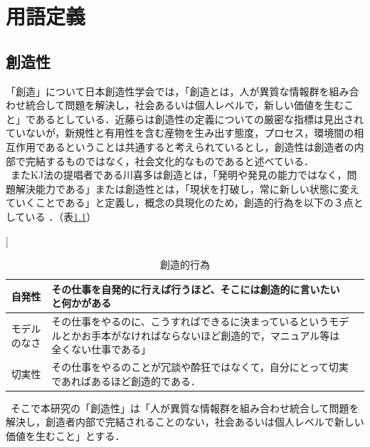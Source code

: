 \documentclass{funthesis}
\begin{document}
\chapter{用語定義}
\section{創造性}
「創造」について日本創造性学会では，「創造とは，人が異質な情報群を組み合わせ統合して問題を解決し，社会あるいは個人レベルで，新しい価値を生むこと」であるとしている\cite{A12}．近藤ら\cite{A13}は創造性の定義についての厳密な指標は見出されていないが，新規性と有用性を含む産物を生み出す態度，プロセス，環境間の相互作用であるということは共通すると考えられているとし，創造性は創造者の内部で完結するものではなく，社会文化的なものであると述べている．\\
\ またKJ法の提唱者である川喜多は創造とは，「発明や発見の能力ではなく，問題解決能力である」または創造性とは，「現状を打破し，常に新しい状態に変えていくことである」と定義し，概念の具現化のため，創造的行為を以下の３点としている\cite{A14} \cite{A15}．（表\ref{souzousei}）

\begin{table}[H]
\begin{center}] 
 \caption{創造的行為}
  \begin{tabular}{|c|p{105mm}|p{10mm}|} \hline
    自発性& その仕事を自発的に行えば行うほど、そこには創造的に言いたいと何かがある\tabularnewline \hline
    モデルのなさ& その仕事をやるのに、こうすればできるに決まっているというモデルとかお手本がなければならないほど創造的で，マニュアル等は全くない仕事である」 \tabularnewline \hline
    切実性&その仕事をやるのことが冗談や酔狂ではなくて，自分にとって切実であればあるほど創造的である．\tabularnewline
    \hline
  \end{tabular}

  \label{souzousei}
  \end{center}
\end{table}


\ そこで本研究の「創造性」は「人が異質な情報群を組み合わせ統合して問題を解決し，創造者内部で完結されることのない，社会あるいは個人レベルで新しい価値を生むこと」とする．
\end{document}
